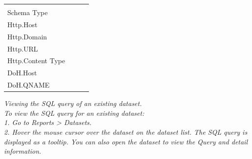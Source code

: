 \begin{description}
\begin{longtable}{p{}|p{}|p{}|p{}}
{                                                                                                            Direction\\
                                                                                                            Schema Type\\
                                                                                                            Http.Host\\
                                                                                                            Http.Domain\\
                                                                                                            Http.URL\\
                                                                                                            Http.Content Type\\
                                                                                                            DoH.Host\\
                                                                                                            DoH.QNAME}   \\ \hline                                                                                                                          
    \end{longtable}

    \item[] \notemark\textit{Viewing the SQL query of an existing dataset.\\
                            To view the SQL query for an existing dataset: \\
                            1. Go to Reports > Datasets.\\ 
                            2. Hover the mouse cursor over the dataset on the dataset list. The SQL query is displayed as a tooltip. You can also open the dataset to view the Query and detail information.}


\end{description}
